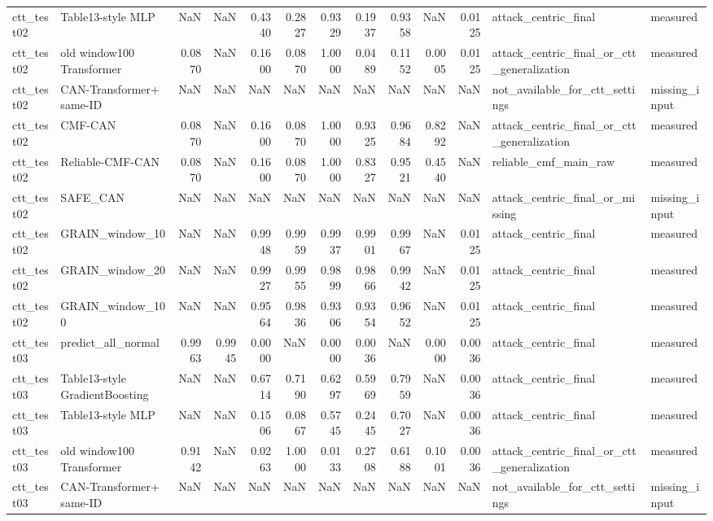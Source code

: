 \begin{tabular}{llrrrrrrrrrll}
ctt_test02 & Table13-style MLP & NaN & NaN & 0.4340 & 0.2827 & 0.9329 & 0.1937 & 0.9358 & NaN & 0.0125 & attack_centric_final & measured \\
ctt_test02 & old window100 Transformer & 0.0870 & NaN & 0.1600 & 0.0870 & 1.0000 & 0.0489 & 0.1152 & 0.0005 & 0.0125 & attack_centric_final_or_ctt_generalization & measured \\
ctt_test02 & CAN-Transformer+ same-ID & NaN & NaN & NaN & NaN & NaN & NaN & NaN & NaN & NaN & not_available_for_ctt_settings & missing_input \\
ctt_test02 & CMF-CAN & 0.0870 & NaN & 0.1600 & 0.0870 & 1.0000 & 0.9325 & 0.9684 & 0.8292 & NaN & attack_centric_final_or_ctt_generalization & measured \\
ctt_test02 & Reliable-CMF-CAN & 0.0870 & NaN & 0.1600 & 0.0870 & 1.0000 & 0.8327 & 0.9521 & 0.4540 & NaN & reliable_cmf_main_raw & measured \\
ctt_test02 & SAFE_CAN & NaN & NaN & NaN & NaN & NaN & NaN & NaN & NaN & NaN & attack_centric_final_or_missing & missing_input \\
ctt_test02 & GRAIN_window_10 & NaN & NaN & 0.9948 & 0.9959 & 0.9937 & 0.9901 & 0.9967 & NaN & 0.0125 & attack_centric_final & measured \\
ctt_test02 & GRAIN_window_20 & NaN & NaN & 0.9927 & 0.9955 & 0.9899 & 0.9866 & 0.9942 & NaN & 0.0125 & attack_centric_final & measured \\
ctt_test02 & GRAIN_window_100 & NaN & NaN & 0.9564 & 0.9836 & 0.9306 & 0.9354 & 0.9652 & NaN & 0.0125 & attack_centric_final & measured \\
ctt_test03 & predict_all_normal & 0.9963 & 0.9945 & 0.0000 & NaN & 0.0000 & 0.0036 & NaN & 0.0000 & 0.0036 & attack_centric_final & measured \\
ctt_test03 & Table13-style GradientBoosting & NaN & NaN & 0.6714 & 0.7190 & 0.6297 & 0.5969 & 0.7959 & NaN & 0.0036 & attack_centric_final & measured \\
ctt_test03 & Table13-style MLP & NaN & NaN & 0.1506 & 0.0867 & 0.5745 & 0.2445 & 0.7027 & NaN & 0.0036 & attack_centric_final & measured \\
ctt_test03 & old window100 Transformer & 0.9142 & NaN & 0.0263 & 1.0000 & 0.0133 & 0.2708 & 0.6188 & 0.1001 & 0.0036 & attack_centric_final_or_ctt_generalization & measured \\
ctt_test03 & CAN-Transformer+ same-ID & NaN & NaN & NaN & NaN & NaN & NaN & NaN & NaN & NaN & not_available_for_ctt_settings & missing_input \\

\end{tabular}
